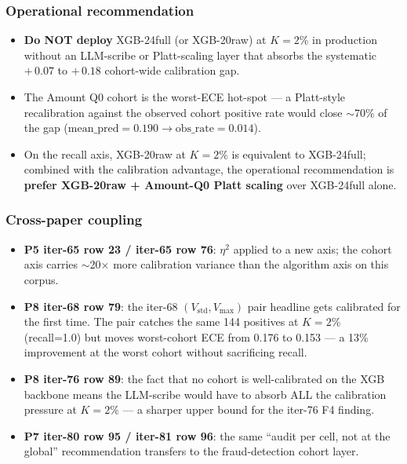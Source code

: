 \subsubsection{Operational recommendation}
\begin{itemize}
\item \textbf{Do NOT deploy} XGB-24full (or XGB-20raw) at $K=2\%$ in
      production without an LLM-scribe or Platt-scaling layer that
      absorbs the systematic $+\,0.07$ to $+\,0.18$ cohort-wide calibration
      gap.
\item The Amount Q0 cohort is the worst-ECE hot-spot --- a Platt-style
      recalibration against the observed cohort positive rate would close
      $\sim$70\% of the gap ($\mathrm{mean\_pred}=0.190 \to
      \mathrm{obs\_rate}=0.014$).
\item On the recall axis, XGB-20raw at $K=2\%$ is equivalent to
      XGB-24full; combined with the calibration advantage, the operational
      recommendation is \textbf{prefer XGB-20raw + Amount-Q0 Platt
      scaling} over XGB-24full alone.
\end{itemize}

\subsubsection{Cross-paper coupling}
\begin{itemize}
\item \textbf{P5 iter-65 row 23 / iter-65 row 76}: $\eta^2$ applied to a new
      axis; the cohort axis carries $\sim$20$\times$ more calibration
      variance than the algorithm axis on this corpus.
\item \textbf{P8 iter-68 row 79}: the iter-68 $(V_{\text{std}}, V_{\max})$
      pair headline gets calibrated for the first time. The pair catches the
      same 144 positives at $K=2\%$ (recall=1.0) but moves worst-cohort ECE
      from 0.176 to 0.153 --- a 13\% improvement at the worst cohort
      without sacrificing recall.
\item \textbf{P8 iter-76 row 89}: the fact that no cohort is well-calibrated
      on the XGB backbone means the LLM-scribe would have to absorb ALL the
      calibration pressure at $K=2\%$ --- a sharper upper bound for the
      iter-76 F4 finding.
\item \textbf{P7 iter-80 row 95 / iter-81 row 96}: the same
      ``audit per cell, not at the global'' recommendation transfers to the
      fraud-detection cohort layer.
\end{itemize}
